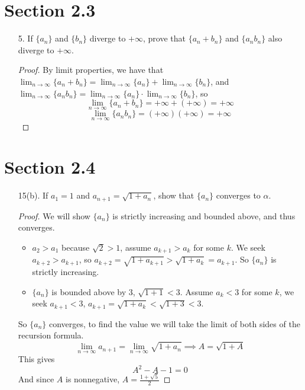 \documentclass[hidelinks,12pt]{article}
\title{\scalebox{2}{Math 523 Homework 3}}
\author{\scalebox{1.5}{Theo Koss}}
\date{October 2023}
\begin{document}
\maketitle
\section*{Section 2.3}
\begin{enumerate}
    \item[5.] If $\{a_n\}$ and $\{b_n\}$ diverge to $+\infty$, prove that $\{a_n+b_n\}$ and $\{a_nb_n\}$ also diverge to $+\infty$. \begin{proof}
    By limit properties, we have that $\lim_{n\to\infty}\{a_n+b_n\}=\lim_{n\to\infty}\{a_n\}+\lim_{n\to\infty}\{b_n\}$, and $\lim_{n\to\infty}\{a_nb_n\}=\lim_{n\to\infty}\{a_n\}\cdot\lim_{n\to\infty}\{b_n\}$, so $$\lim_{n\to\infty}\{a_n+b_n\}=+\infty+(+\infty)=+\infty$$ $$\lim_{n\to\infty}\{a_nb_n\}=(+\infty)(+\infty)=+\infty$$
    \end{proof}
\end{enumerate}
\section*{Section 2.4}
\begin{enumerate} 
    \item[15(b).] If $a_1=1$ and $a_{n+1}=\sqrt{1+a_n}$, show that $\{a_n\}$ converges to $\alpha$.\begin{proof}
        We will show $\{a_n\}$ is strictly increasing and bounded above, and thus converges.\begin{itemize}
            \item $a_2>a_1$ because $\sqrt{2}>1$, assume $a_{k+1}>a_{k}$ for some $k$. We seek $a_{k+2}>a_{k+1}$, so $a_{k+2}=\sqrt{1+a_{k+1}}>\sqrt{1+a_k}=a_{k+1}$. So $\{a_n\}$ is strictly increasing.
            \item $\{a_n\}$ is bounded above by 3, $\sqrt{1+1}<3$. Assume $a_k<3$ for some $k$, we seek $a_{k+1}<3$, $a_{k+1}=\sqrt{1+a_k}<\sqrt{1+3}<3$.
        \end{itemize}So $\{a_n\}$ converges, to find the value we will take the limit of both sides of the recursion formula. $$\lim_{n\to\infty}a_{n+1}=\lim_{n\to\infty}\sqrt{1+a_n}\implies A=\sqrt{1+A}$$ This gives $$A^2-A-1=0$$ And since $A$ is nonnegative, $A=\frac{1+\sqrt{5}}{2}$
    \end{proof}
\end{enumerate}
\end{document}
